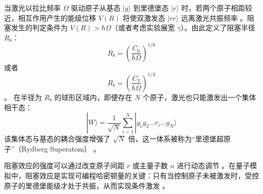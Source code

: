 \documentclass[../main.tex]{subfiles}
\begin{document}
当激光以拉比频率 $\Omega$ 驱动原子从基态 $|g\rangle$ 到里德堡态 $|r\rangle$ 时，若两个原子相距较近，相互作用产生的能级位移 $V(R)$ 将使双激发态 $|rr\rangle$ 远离激光共振频率 。阻塞发生的判定条件为 $V(R) > \hbar\Omega$（或者考虑实验展宽 $\gamma$）。由此定义了阻塞半径 $R_b$：
\begin{equation}
R_b = \left( \frac{C_6}{\hbar\Omega} \right)^{1/6}
\end{equation}
或者
\begin{equation}
R_b = \left( \frac{C_3}{\hbar\Omega} \right)^{1/3} 
\end{equation}。
在半径为 $R_b$ 的球形区域内，即便存在 $N$ 个原子，激光也只能激发出一个集体相干态：
\begin{equation}
|W\rangle = \frac{1}{\sqrt{N}} \sum_{i=1}^N |g_1 g_2 \dots r_i \dots g_N\rangle
\end{equation}
该集体态与基态的耦合强度增强了 $\sqrt{N}$ 倍，这一体系被称为“里德堡超原子”（Rydberg Superatom） 。

阻塞效应的强度可以通过改变原子间距 $r$ 或主量子数 $n$ 进行动态调节 。在量子模拟中，阻塞效应是实现可编程哈密顿量的关键：只有当控制原子未被激发时，受控原子的里德堡能级才处于共振，从而实现条件激发 。
\end{document}
